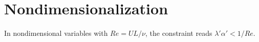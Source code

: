 \section{Nondimensionalization}
In nondimensional variables with $Re=UL/\nu$, the constraint reads $\lambda'\alpha' < 1/Re$.
